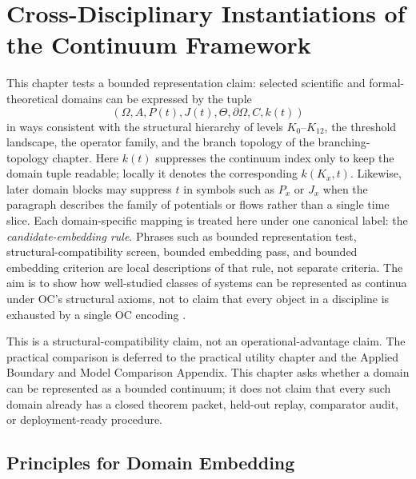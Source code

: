 
\section{Cross-Disciplinary Instantiations of the Continuum Framework}
\label{sec:disciplines-extended}

This chapter tests a bounded representation claim: selected scientific and
formal-theoretical domains can be expressed by the tuple
\[
  (\Omega, A, P(t), J(t), \Theta, \partial\Omega, C, k(t))
\]
in ways consistent with the structural hierarchy of levels
\(K_0\)–\(K_{12}\), the threshold landscape, the operator family, and the
branch topology of the branching-topology chapter.
Here \(k(t)\) suppresses the continuum index only to keep the domain tuple
readable; locally it denotes the corresponding \(k(K_x,t)\).
Likewise, later domain blocks may suppress \(t\) in symbols such as \(P_x\)
or \(J_x\) when the paragraph describes the family of potentials or flows
rather than a single time slice.
Each domain-specific mapping is treated here under one canonical label: the
\emph{candidate-embedding rule}. Phrases such as bounded representation test,
structural-compatibility screen, bounded embedding pass, and bounded embedding
criterion are local descriptions of that rule, not separate criteria. The aim
is to show how well-studied classes of systems can
be represented as continua under OC's structural axioms, not to claim that
every object in a discipline is exhausted by a single OC encoding
\parencite{anderson_more_is_different}.

This is a structural-compatibility claim, not an operational-advantage claim.
The practical comparison is deferred to
the practical utility chapter and
the Applied Boundary and Model Comparison Appendix. This chapter asks
whether a domain can be represented as a bounded continuum; it does not claim
that every such domain already has a closed theorem packet, held-out replay,
comparator audit, or deployment-ready procedure.

\subsection{Principles for Domain Embedding}

